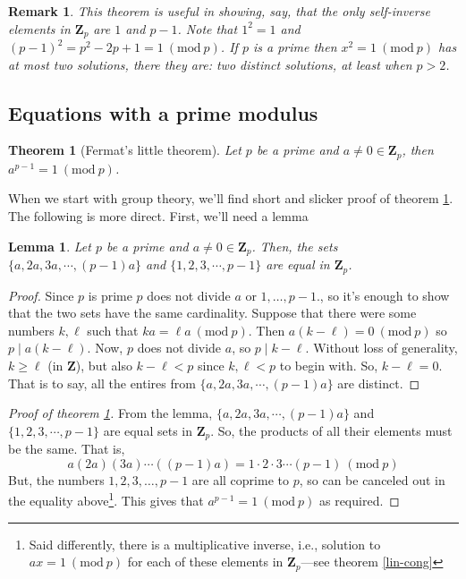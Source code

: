 \documentclass[12pt]{article}
\numberwithin{equation}{subsection}
\newtheorem{thm}[subsection]{Theorem}
\newtheorem{lem}[subsection]{Lemma}
\theoremstyle{note}
\newtheorem{remark}[subsection]{Remark}
\newcommand{\Mod}[1]{\ (\mathrm{mod}\ #1)}
\begin{document}
\begin{remark} This theorem is useful in showing, say, that the only self-inverse elements in $\mathbf{Z}_p$ are $1$ and $p-1$. Note that $1^2=1$ and $(p-1)^2=p^2-2p+1=1\Mod{p}$. If $p$ is a prime then $x^2=1\Mod{p}$ has at most two solutions, there they are: two distinct solutions, at least when $p>2$.
\end{remark}
\subsection{Equations with a prime modulus}


\begin{thm}[Fermat's little theorem]\label{flt}
	Let $p$ be a prime and $a\neq 0\in\mathbf{Z}_p$, then $a^{p-1}=1\Mod{p}$.
\end{thm}

When we start with group theory, we'll find short and slicker proof of theorem \ref{flt}. The following is more direct. First, we'll need a lemma

\begin{lem} \label{flt-lem} Let $p$ be a prime and $a\neq 0\in\mathbf{Z}_p$. Then, the sets $\{a,2a,3a,\cdots,(p-1)a\}$ and $\{1,2,3,\cdots,p-1\}$ are equal in $\mathbf{Z}_p$.
\end{lem}
\begin{proof}
	Since $p$ is prime $p$ does not divide $a$ or $1,\dots,p-1$., so it's enough to show that the two sets have the same cardinality. Suppose that there were some numbers $k,\ell$ such that $ka=\ell a\Mod{p}$. Then $a(k-\ell)=0\Mod{p}$ so $p\mid a(k-\ell)$. Now, $p$ does not divide $a$, so $p\mid k-\ell$. Without loss of generality, $k\geq \ell$ (in $\mathbf{Z}$), but also $k-\ell < p$ since $k,\ell<p$ to begin with. So, $k-\ell=0$. That is to say, all the entires from $\{a,2a,3a,\cdots,(p-1)a\}$ are distinct. 
\end{proof}

\begin{proof}[Proof of theorem \ref{flt}]
From the lemma, $\{a,2a,3a,\cdots,(p-1)a\}$ and $\{1,2,3,\cdots,p-1\}$ are equal sets in $\mathbf{Z}_p$. So, the products of all their elements must be the same. That is, \[ a (2a) (3a) \cdots ((p-1)a)=1\cdot2 \cdot 3\cdots (p-1) \Mod{p}\] But, the numbers $1,2,3,\dots,p-1$ are all coprime to $p$, so can be canceled out in the equality above\footnote{Said differently, there is a multiplicative inverse, i.e., solution to $ax=1\Mod{p}$ for each of these elements in $\mathbf{Z}_p$---see theorem \ref{lin-cong}}. This gives that $a^{p-1}=1\Mod{p}$ as required. 
\end{proof}
\end{document}
